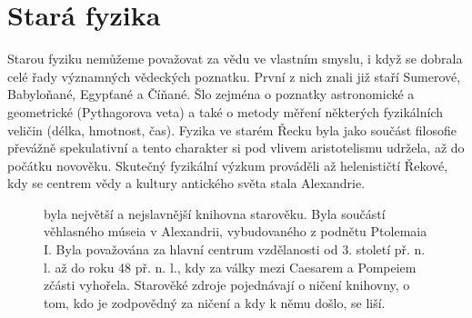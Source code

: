   \section{Stará fyzika}\label{fyz:IchapIIsecII}
    Starou fyziku nemůžeme považovat za vědu ve vlastním smyslu, i když se dobrala celé řady
    významných vědeckých poznatku. První z nich znali již staří Sumerové, Babyloňané, Egypťané a
    Číňané. Šlo zejména o  poznatky astronomické a geometrické (Pythagorova veta) a také o metody
    měření některých fyzikálních veličin (délka, hmotnost, čas). Fyzika ve starém Řecku byla jako
    součást filosofie převážně spekulativní a tento charakter si pod vlivem aristotelismu udržela,
    až do počátku novověku. Skutečný fyzikální výzkum prováděli až helenističtí Řekové, kdy se
    centrem vědy a kultury antického světa stala Alexandrie. 
    
    \begin{figure}[ht!]  %
      \centering
      \caption{ \wikiAlexLib byla největší a nejslavnější knihovna starověku. Byla součástí
                věhlasného múseia v Alexandrii, vybudovaného z podnětu Ptolemaia I. Byla považována
                za hlavní centrum vzdělanosti od 3. století př. n. l. až do roku 48 př. n. l., kdy
                za války mezi Caesarem a Pompeiem zčásti vyhořela. Starověké zdroje pojednávají o
                ničení knihovny, o tom, kdo je zodpovědný za ničení a kdy k němu došlo, se liší.
                \cite[s.~76]{Stoll2009}}
      \label{fyz:fig0894}
    \end{figure} 

